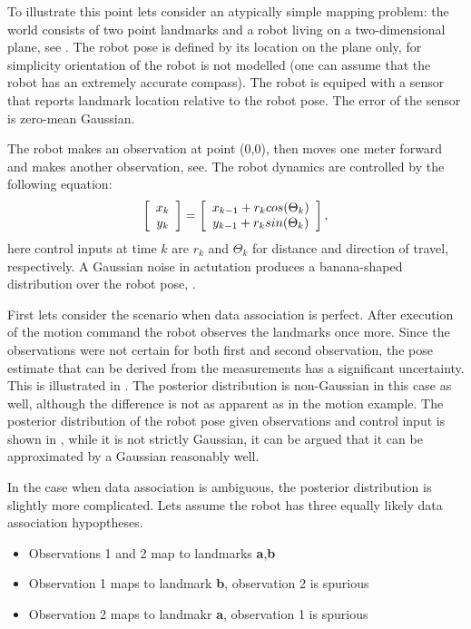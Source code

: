 To illustrate this point lets consider an atypically simple mapping
problem: the world consists of two point landmarks and a robot living
on a two-dimensional plane, see . The robot
pose is defined by its location on the plane only, for simplicity
orientation of the robot is not modelled (one can assume that the
robot has an extremely accurate compass). The robot is equiped with a
sensor that reports landmark location relative to the robot pose. The
error of the sensor is zero-mean Gaussian.

The robot makes an observation at point (0,0), then moves one meter
forward and makes another observation,
see. The robot dynamics are controlled by
the following equation:
$$
  \left[\begin{array}{c} x_k\\y_k \end{array} \right] = \left[\begin{array}{c}  x_{k-1} + r_k cos(\Theta_k)\\
                               y_{k-1} + r_k sin(\Theta_k)  \end{array} \right],
$$
here control inputs at time $k$ are $r_k$ and $\Theta_k$ for distance
and direction of travel, respectively. A Gaussian noise in actutation
produces a banana-shaped distribution over the robot pose,
.

First lets consider the scenario when data association is perfect.
After execution of the motion command the robot observes the landmarks
once more. Since the observations were not certain for both first and
second observation, the pose estimate that can be derived from the
measurements has a significant uncertainty. This is illustrated in
. The posterior distribution is non-Gaussian
in this case as well, although the difference is not as apparent as in
the motion example. The posterior distribution of the robot pose given
observations and control input is shown in
, while it is not strictly Gaussian, it can
be argued that it can be approximated by a Gaussian reasonably well.

In the case when data association is ambiguous, the posterior
distribution is slightly more complicated. Lets assume the robot has
three equally likely data association hypoptheses. 

\begin{itemize}
\item Observations 1 and 2 map to landmarks {\bf a},{\bf b}
\item Observation 1 maps to landmark {\bf b}, observation 2 is spurious
\item Observation 2 maps to landmakr {\bf a}, observation 1 is spurious
\end{itemize}

